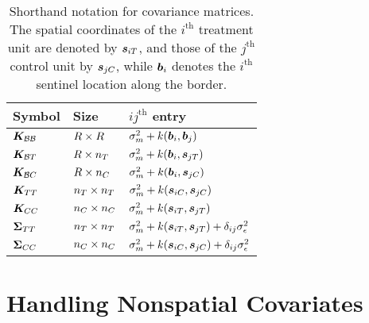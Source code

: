 \documentclass{article}
\begin{document}
\begin{table}[bp]
    \centering
    \bgroup
    \def\arraystretch{1.2}%
    \begin{tabular}{lll}
        \hline
        Symbol & Size                       & \(ij^{\mathrm{th}}\) entry                                                      \\ \hline
        \(\bm{K}_{\mathcal{B} \mathcal{B}}\) & \(R \times R\) & \(\sigmamu^2 + k\del{\sentinel_i,\sentinel_j}\)                                 \\ 
        \(\bm{K}_{\mathcal{B} T}\) & \(R \times n_T\) & \(\sigmamu^2 + k\del{\sentinel_i,\svec_{j\treat}}\)                             \\ 
        \(\bm{K}_{\mathcal{B} C}\) & \(R \times n_C\) & \(\sigmamu^2 + k\del{\sentinel_i,\svec_{j\ctrol}}\)                             \\
        \(\bm{K}_{T T}\) & \(n_T \times n_T\) & \(\sigmamu^2 + k\del{\svec_{i\ctrol},\svec_{j\ctrol}}\)                         \\
        \(\bm{K}_{C C}\) & \(n_C \times n_C\) & \(\sigmamu^2 + k\del{\svec_{i\treat},\svec_{j\treat}}\)                         \\ 
        \(\bm{\Sigma}_{T T}\) & \(n_T \times n_T\) & \(\sigmamu^2 + k\del{\svec_{i\treat},\svec_{j\treat}} + \delta_{ij} \sigman^2\) \\ 
        \(\bm{\Sigma}_{C C}\) & \(n_C \times n_C\) & \(\sigmamu^2 + k\del{\svec_{i\ctrol},\svec_{j\ctrol}} + \delta_{ij} \sigman^2\) \\
        \hline
    \end{tabular}
    \egroup
    \caption{
        Shorthand notation for covariance matrices. The spatial coordinates of the \(i^\mathrm{th}\) treatment unit are denoted by \(\bm{s}_{iT}\),
and those of the \(j^\mathrm{th}\) control unit by \(\bm{s}_{jC}\), while \(\bm{b}_i\) denotes the \(i^\mathrm{th}\) sentinel location along the border.
        \label{table:notation}
    }
\end{table}

\section{Handling Nonspatial Covariates}
\label{sec:covariates}
\end{document}

